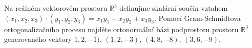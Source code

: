 Na reálném vektorovém prostoru $\mathbb{R}^3$ definujme skalární součin vztahem
$(x_1, x_2, x_3) \cdot (y_1, y_2, y_3) = x_1 y_1 + x_2 y_2 + x_3 y_3$. Pomocí
Gram-Schmidtova ortogonalizačního procesu najděte ortonormální bázi podprostoru
prostoru $\mathbb{R}^3$ generovaného vektory $1,2,-1)$, $(1,2,-3)$, $(4,8,-8)$, $(3,6,-9)$.
